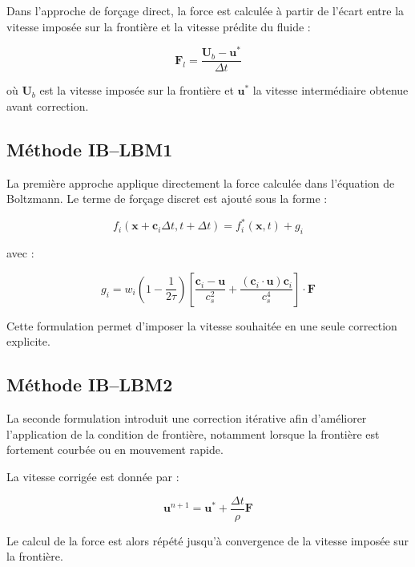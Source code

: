 \documentclass[12pt,a4paper]{report}
\begin{document}
Dans l’approche de forçage direct, la force est calculée à partir de l’écart entre la vitesse imposée sur la frontière et la vitesse prédite du fluide :

\begin{equation}
\mathbf{F}_{l}
=
\frac{\mathbf{U}_{b}-\mathbf{u}^{*}}{\Delta t}
\end{equation}

où $\mathbf{U}_{b}$ est la vitesse imposée sur la frontière et $\mathbf{u}^{*}$ la vitesse intermédiaire obtenue avant correction.

\subsection{Méthode IB--LBM1}

La première approche applique directement la force calculée dans l’équation de Boltzmann. Le terme de forçage discret est ajouté sous la forme :

\begin{equation}
f_i(\mathbf{x}+\mathbf{c}_i\Delta t,t+\Delta t)
=
f_i^{*}(\mathbf{x},t)+g_i
\end{equation}

avec :

\begin{equation}
g_i
=
w_i
\left(
1-\frac{1}{2\tau}
\right)
\left[
\frac{\mathbf{c}_i-\mathbf{u}}{c_s^2}
+
\frac{(\mathbf{c}_i \cdot \mathbf{u})\mathbf{c}_i}{c_s^4}
\right]
\cdot
\mathbf{F}
\end{equation}

Cette formulation permet d’imposer la vitesse souhaitée en une seule correction explicite.

\subsection{Méthode IB--LBM2}

La seconde formulation introduit une correction itérative afin d’améliorer l’application de la condition de frontière, notamment lorsque la frontière est fortement courbée ou en mouvement rapide.

La vitesse corrigée est donnée par :

\begin{equation}
\mathbf{u}^{n+1}
=
\mathbf{u}^{*}
+
\frac{\Delta t}{\rho}\mathbf{F}
\end{equation}

Le calcul de la force est alors répété jusqu’à convergence de la vitesse imposée sur la frontière.
\end{document}
